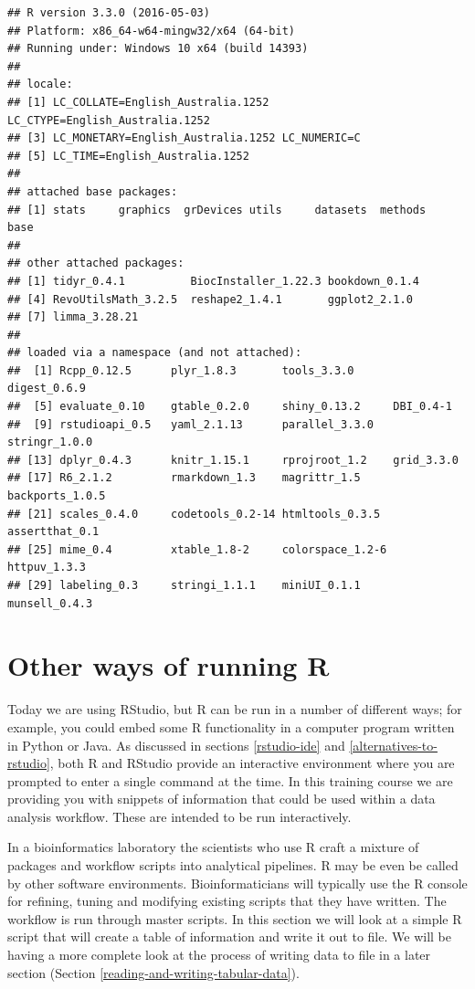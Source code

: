 \documentclass[a4paper]{book}
\begin{document}
\begin{verbatim}
## R version 3.3.0 (2016-05-03)
## Platform: x86_64-w64-mingw32/x64 (64-bit)
## Running under: Windows 10 x64 (build 14393)
## 
## locale:
## [1] LC_COLLATE=English_Australia.1252  LC_CTYPE=English_Australia.1252   
## [3] LC_MONETARY=English_Australia.1252 LC_NUMERIC=C                      
## [5] LC_TIME=English_Australia.1252    
## 
## attached base packages:
## [1] stats     graphics  grDevices utils     datasets  methods   base     
## 
## other attached packages:
## [1] tidyr_0.4.1          BiocInstaller_1.22.3 bookdown_0.1.4      
## [4] RevoUtilsMath_3.2.5  reshape2_1.4.1       ggplot2_2.1.0       
## [7] limma_3.28.21       
## 
## loaded via a namespace (and not attached):
##  [1] Rcpp_0.12.5      plyr_1.8.3       tools_3.3.0      digest_0.6.9    
##  [5] evaluate_0.10    gtable_0.2.0     shiny_0.13.2     DBI_0.4-1       
##  [9] rstudioapi_0.5   yaml_2.1.13      parallel_3.3.0   stringr_1.0.0   
## [13] dplyr_0.4.3      knitr_1.15.1     rprojroot_1.2    grid_3.3.0      
## [17] R6_2.1.2         rmarkdown_1.3    magrittr_1.5     backports_1.0.5 
## [21] scales_0.4.0     codetools_0.2-14 htmltools_0.3.5  assertthat_0.1  
## [25] mime_0.4         xtable_1.8-2     colorspace_1.2-6 httpuv_1.3.3    
## [29] labeling_0.3     stringi_1.1.1    miniUI_0.1.1     munsell_0.4.3
\end{verbatim}

\section{Other ways of running R}\label{other-ways-of-running-r}

Today we are using RStudio, but R can be run in a number of different
ways; for example, you could embed some R functionality in a computer
program written in Python or Java. As discussed in sections
\ref{rstudio-ide} and \ref{alternatives-to-rstudio}, both R and RStudio
provide an interactive environment where you are prompted to enter a
single command at the time. In this training course we are providing you
with snippets of information that could be used within a data analysis
workflow. These are intended to be run interactively.

In a bioinformatics laboratory the scientists who use R craft a mixture
of packages and workflow scripts into analytical pipelines. R may be
even be called by other software environments. Bioinformaticians will
typically use the R console for refining, tuning and modifying existing
scripts that they have written. The workflow is run through master
scripts. In this section we will look at a simple R script that will
create a table of information and write it out to file. We will be
having a more complete look at the process of writing data to file in a
later section (Section \ref{reading-and-writing-tabular-data}).
\end{document}
